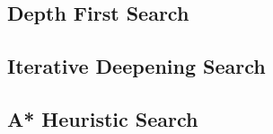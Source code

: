 \documentclass[a4paper]{article}
\begin{document}
\begin{appendices}
  \newpage
  \subsection{Depth First Search}
  \label{app:example-dfs}
  

  \newpage
  \subsection{Iterative Deepening Search}
  \label{app:example-ids}
  

  \newpage
  \subsection{A* Heuristic Search}
  \label{app:example-a*}
  


\end{appendices}
\end{document}
